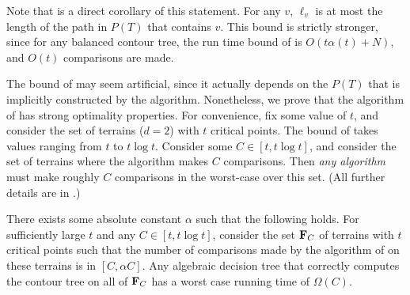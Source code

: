 Note that  is a direct corollary of this statement. For any $v$, $\ell_v$ is at most
the length of the path in $P(T)$ that contains $v$.
This bound is strictly stronger,
since for any balanced contour tree, the run time bound of  is $O(t\alpha(t) + N)$, and $O(t)$
comparisons are made.

The bound of  may seem artificial, since it actually depends on the $P(T)$ that
is implicitly constructed by the algorithm. Nonetheless, we prove that the algorithm of 
has strong optimality properties. For convenience, fix some value of $t$, and consider the set
of terrains ($d=2$) with $t$ critical points. The bound of  takes values ranging
from $t$ to $t\log t$. Consider some $C \in [t,t\log t]$, and consider the set of terrains
where the algorithm makes $C$ comparisons. Then \emph{any algorithm} must make roughly $C$
comparisons in the worst-case over this set. (All further details are in .)

\begin{theorem} 
\label{thm:main-lb}
There exists some absolute constant $\alpha$ such that the following holds.
For sufficiently large $t$ and any $C\in [t, t\log t]$, consider the set ${\bf F}_C$ of terrains with $t$ critical points such that
the number of comparisons made by the algorithm of  on these terrains is in $[C,\alpha C]$.
Any algebraic decision tree that correctly computes
the contour tree on all of ${\bf F}_C$ has a worst case running time of $\Omega(C)$.
\end{theorem}
% 
% 

